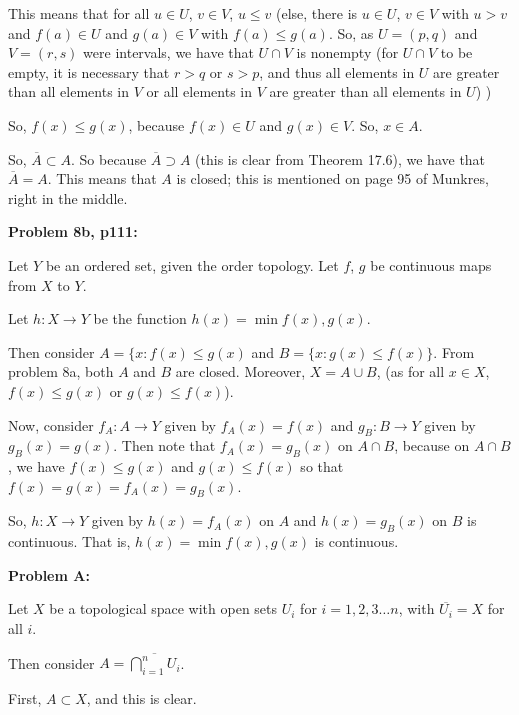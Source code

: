 \documentclass[a4paper,12pt]{article}
\begin{document}
This means that for all $u \in U$, $v \in V$, $u \leq v$ (else, there is $u \in U$, $v \in V$ with $u > v$ and $f(a) \in U$ and $g(a) \in V$ with $f(a) \leq g(a)$. So, as $U = (p,q)$ and $V=(r,s)$ were intervals, we have that $U \cap V$ is nonempty (for $U \cap V$ to be empty, it is necessary that $r>q$ or $s > p$, and thus all elements in $U$ are greater than all elements in $V$ or all elements in $V$ are greater than all elements in $U$) )

So, $f(x) \leq g(x)$, because $f(x) \in U$ and $g(x) \in V$. So, $x \in A$.

So, $\overline{A} \subset A$. So because $\overline{A} \supset A$ (this is clear from Theorem 17.6), we have that $\overline{A} = A$. This means that $A$ is closed; this is mentioned on page 95 of Munkres, right in the middle.

\shunt

{\bf Problem 8b, p111:}

Let $Y$ be an ordered set, given the order topology. Let $f$, $g$ be continuous maps from $X$ to $Y$.

Let $h: X \to Y$ be the function $h(x) = \min{f(x),g(x)}$.

Then consider $A = \{x: f(x) \leq g(x)$ and $B = \{x: g(x) \leq f(x)\}$. From problem 8a, both $A$ and $B$ are closed. Moreover, $X = A \cup B$, (as for all $x \in X$, $f(x) \leq g(x)$ or $g(x) \leq f(x)$).

Now, consider $f_A: A \to Y$ given by $f_A(x) = f(x)$ and $g_B: B \to Y$ given by $g_B(x) = g(x)$. Then note that $f_A(x) = g_B(x)$ on $A \cap B$, because on $A \cap B$, we have $f(x) \leq g(x)$ and $g(x) \leq f(x)$ so that $f(x) = g(x)=f_A(x) = g_B(x)$.

So, $h: X \to Y$ given by $h(x) = f_A(x)$ on $A$ and $h(x) = g_B(x)$ on $B$ is continuous. That is, $h(x) = \min{f(x),g(x)}$ is continuous.

\shunt

{\bf Problem A:}

Let $X$ be a topological space with open sets $U_i$ for $i=1,2,3 \ldots n$, with $\overline{U_i} = X$ for all $i$.

Then consider $A = \overline{\bigcap\limits_{i=1}^n U_i}$. 

First, $A \subset X$, and this is clear.
\end{document}
